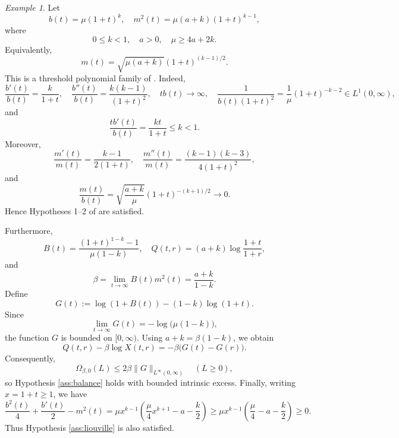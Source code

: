 \documentclass[11pt,reqno]{amsart}
\theoremstyle{definition}
\theoremstyle{remark}
\newtheorem{example}{Example}
\begin{document}
	\begin{example}
		Let
		$$
		b(t)=\mu(1+t)^k,
		\quad
		m^2(t)=\mu(a+k)(1+t)^{k-1},
		$$
		where
		$$
		0 \leq k<1,
		\quad
		a>0,
		\quad
		\mu\geq4a+2k.
		$$
		Equivalently,
		$$
		m(t)=\sqrt{\mu(a+k)}(1+t)^{(k-1)/2}.
		$$
		This is a threshold polynomial family of \cite[Example 1]{DGR2019}.
		Indeed,
		$$
		\frac{b'(t)}{b(t)}=\frac{k}{1+t},
		\quad
		\frac{b''(t)}{b(t)}=\frac{k(k-1)}{(1+t)^2}, \quad
		tb(t)\longrightarrow\infty,
		\quad
		\frac{1}{b(t)(1+t)^2}
		=\frac{1}{\mu}(1+t)^{-k-2}\in L^1(0,\infty),
		$$
		and
		$$
		\frac{tb'(t)}{b(t)}=\frac{kt}{1+t}\leq k<1.
		$$
		Moreover,
		$$
		\frac{m'(t)}{m(t)}=\frac{k-1}{2(1+t)},
		\quad
		\frac{m''(t)}{m(t)}
		=\frac{(k-1)(k-3)}{4(1+t)^2},
		$$
		and
		$$
		\frac{m(t)}{b(t)}
		=\sqrt{\frac{a+k}{\mu}}(1+t)^{-(k+1)/2}
		\longrightarrow0.
		$$
		Hence Hypotheses 1--2 of \cite{DGR2019} are satisfied.
		
		Furthermore,
		$$
		B(t)=\frac{(1+t)^{1-k}-1}{\mu(1-k)},
		\quad
		Q(t,r)=(a+k)\log\frac{1+t}{1+r},
		$$
		and
		$$
		\beta=\lim_{t\to\infty}B(t)m^2(t)
		=\frac{a+k}{1-k}.
		$$
		Define
		$$
		G(t):=\log(1+B(t))-(1-k)\log(1+t).
		$$
		Since
		$$
		\lim_{t\to\infty}G(t)=-\log\bigl(\mu(1-k)\bigr),
		$$
		the function $G$ is bounded on $[0,\infty)$. Using
		$a+k=\beta(1-k)$, we obtain
		$$
		Q(t,r)-\beta\log X(t,r)
		=-\beta\bigl(G(t)-G(r)\bigr).
		$$
		Consequently,
		$$
		\Omega_{\beta,0}(L)
		\leq2\beta\|G\|_{L^\infty(0,\infty)}
		\quad(L\geq0),
		$$
		so Hypothesis \ref{ass:balance} holds with bounded intrinsic excess.
		Finally, writing $x=1+t\geq1$, we have
		$$
		\frac{b^2(t)}4+\frac{b'(t)}2-m^2(t)=\mu x^{k-1}
		\left(\frac{\mu}{4}x^{k+1}-a-\frac{k}{2}\right)\geq\mu x^{k-1}
		\left(\frac{\mu}{4}-a-\frac{k}{2}\right)\geq0.
		$$
		Thus Hypothesis \ref{ass:liouville} is also satisfied.
	\end{example}
	
\end{document}
